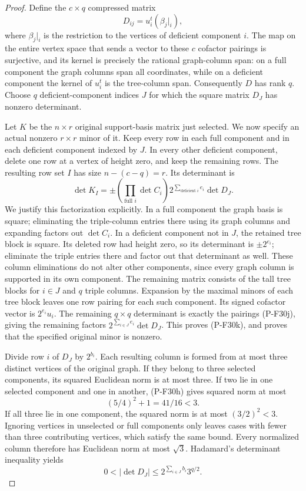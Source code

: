 \begin{proof}
Define the $c\times q$ compressed matrix
\[
 D_{ij}=u_i^t(\beta_j|_i),
 \tag{P-F30j}
\]
where $\beta_j|_i$ is the restriction to the vertices
of deficient component $i$. The map on the entire
vertex space that sends a vector to these $c$
cofactor pairings is surjective, and its kernel
is precisely the rational graph-column span:
on a full component the graph columns span all
coordinates, while on a deficient component the
kernel of $u_i^t$ is the tree-column span.
Consequently $D$ has rank $q$. Choose $q$
deficient-component indices $J$ for which the
square matrix $D_J$ has nonzero determinant.

Let $K$ be the $n\times r$ original support-basis
matrix just selected. We now specify an actual
nonzero $r\times r$ minor of it. Keep every row
in each full component and in each deficient
component indexed by $J$. In every other deficient
component, delete one row at a vertex of height zero,
and keep the remaining rows. The resulting row
set $I$ has size $n-(c-q)=r$. Its determinant is
\[
 \det K_I
   =\pm\left(\prod_{\text{full }i}\det C_i\right)
          2^{\sum_{\text{deficient }i}e_i}
          \det D_J.
 \tag{P-F30k}
\]
We justify this factorization explicitly.
In a full component the graph basis is square;
eliminating the triple-column entries there
using its graph columns and expanding factors
out $\det C_i$. In a deficient component not
in $J$, the retained tree block is square.
Its deleted row had height zero, so its determinant
is $\pm2^{e_i}$; eliminate the triple entries
there and factor out that determinant as well.
These column eliminations do not alter other
components, since every graph column is supported
in its own component.
The remaining matrix consists of the tall
tree blocks for $i\in J$ and $q$ triple columns.
Expansion by the maximal minors of each tree
block leaves one row pairing for each such
component. Its signed cofactor vector is
$2^{e_i}u_i$. The remaining $q\times q$
determinant is exactly the pairings (P-F30j),
giving the remaining factors
$2^{\sum_{i\in J}e_i}\det D_J$.
This proves (P-F30k), and proves that the
specified original minor is nonzero.

Divide row $i$ of $D_J$ by $2^{b_i}$.
Each resulting column is formed from at most
three distinct vertices of the original graph.
If they belong to three selected components,
its squared Euclidean norm is at most three.
If two lie in one selected component and one
in another, (P-F30h) gives squared norm at most
\[
 (5/4)^2+1=41/16<3.
\]
If all three lie in one component, the squared
norm is at most $(3/2)^2<3$. Ignoring vertices
in unselected or full components only leaves
cases with fewer than three contributing vertices,
which satisfy the same bound. Every normalized
column therefore has Euclidean norm at most
$\sqrt3$. Hadamard's determinant inequality yields
\[
 0<|\det D_J|
       \le 2^{\sum_{i\in J}b_i}3^{q/2}.
 \tag{P-F30l}
\]


\end{proof}
